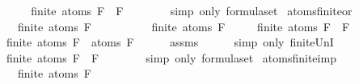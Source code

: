 \begin{isabellebody}
\ \ \isamarkupfalse%
\ \isamarkupfalse%
\ {\isachardoublequoteopen}finite\ {\isacharparenleft}atoms\ {\isacharparenleft}F{}\ \isactrlbold {\isasymand}\ F{}{\isacharparenright}{\isacharparenright}{\isachardoublequoteclose}\ \ \isanewline
\ \ \ \ \isamarkupfalse%
\ {\isacharparenleft}simp\ only{\isacharcolon}\ formula{\isachardot}set{\isacharparenleft}{}{\isacharparenright}{\isacharparenright}\isanewline
{}\isamarkupfalse%
%
\endisatagproof
{\isafoldproof}%
%
\isadelimproof
\isanewline
%
\endisadelimproof
\isanewline
{}\isamarkupfalse%
\ atoms{\isacharunderscore}finite{\isacharunderscore}or{\isacharcolon}\isanewline
\ \ \ {\isachardoublequoteopen}finite\ {\isacharparenleft}atoms\ F{}{\isacharparenright}{\isachardoublequoteclose}\isanewline
\ \ \ \ \ \ \ \ \ \ {\isachardoublequoteopen}finite\ {\isacharparenleft}atoms\ F{}{\isacharparenright}{\isachardoublequoteclose}\isanewline
\ \ \ \ \ {\isachardoublequoteopen}finite\ {\isacharparenleft}atoms\ {\isacharparenleft}F{}\ \isactrlbold {\isasymor}\ F{}{\isacharparenright}{\isacharparenright}{\isachardoublequoteclose}\isanewline
%
\isadelimproof
%
\endisadelimproof
%
\isatagproof
{}\isamarkupfalse%
\ {\isacharminus}\isanewline
\ \ \isamarkupfalse%
\ {\isachardoublequoteopen}finite\ {\isacharparenleft}atoms\ F{}\ {\isasymunion}\ atoms\ F{}{\isacharparenright}{\isachardoublequoteclose}\isanewline
\ \ \ \ \isamarkupfalse%
\ assms\isanewline
\ \ \ \ \isamarkupfalse%
\ {\isacharparenleft}simp\ only{\isacharcolon}\ finite{\isacharunderscore}UnI{\isacharparenright}\isanewline
\ \ \isamarkupfalse%
\ \isamarkupfalse%
\ {\isachardoublequoteopen}finite\ {\isacharparenleft}atoms\ {\isacharparenleft}F{}\ \isactrlbold {\isasymor}\ F{}{\isacharparenright}{\isacharparenright}{\isachardoublequoteclose}\ \ \isanewline
\ \ \ \ \isamarkupfalse%
\ {\isacharparenleft}simp\ only{\isacharcolon}\ formula{\isachardot}set{\isacharparenleft}{}{\isacharparenright}{\isacharparenright}\isanewline
{}\isamarkupfalse%
%
\endisatagproof
{\isafoldproof}%
%
\isadelimproof
\isanewline
%
\endisadelimproof
\isanewline
{}\isamarkupfalse%
\ atoms{\isacharunderscore}finite{\isacharunderscore}imp{\isacharcolon}\isanewline
\ \ \ {\isachardoublequoteopen}finite\ {\isacharparenleft}atoms\ F{}{\isacharparenright}{\isachardoublequoteclose}\isanewline

\end{isabellebody}
